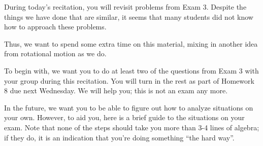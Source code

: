 \documentclass[12pt]{article}
\begin{document}
\Large
\centerline{}
\normalsize
\centerline{}

During today's recitation, you will revisit problems from Exam 3. Despite the things we have done that are similar, it seems that many students did not know how to approach these problems.

Thus, we want to spend some extra time on this material, mixing in another idea from rotational motion as we do.

To begin with, we want you to do at least two of the questions from Exam 3 with your group during this recitation. You will turn in the rest as part of Homework 8 due next Wednesday. We will help you; this is not an exam any more. 

In the future, we want you to be able to figure out how to analyze situations on your own. However, to aid you, here is a brief guide to the situations on your exam. Note that none of the steps should take you more than 3-4 lines of algebra; if they do, it is an indication that you're doing something ``the hard way''.
\vspace{0.8in}
\end{document}
